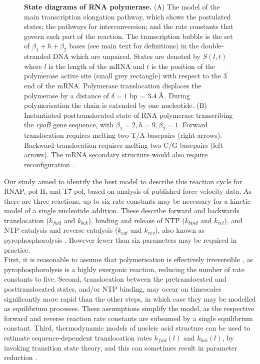 \documentclass[10pt,letterpaper]{article}
\newcommand{\angstrom}{\mbox{\normalfont\AA}}
\begin{document}
\begin{figure}[!h]
\caption{\textbf{ State diagrams of RNA polymerase.}
(A) The model of the main transcription elongation pathway, which shows the postulated states; the pathways for interconversion; and the rate constants that govern each part of the reaction. The transcription bubble is the set of $\beta_1 + h + \beta_2$ bases (see main text for definitions) in the double-stranded DNA which are unpaired. States are denoted by $S(l, t)$ where $l$ is the length of the mRNA and $t$ is the position of the polymerase active site (small grey rectangle) with respect to the $3^\prime$ end of the mRNA.  Polymerase translocation displaces the polymerase by a distance of $\delta = 1$ bp = $3.4\; \angstrom$. During polymerisation the chain is extended by one nucleotide. (B) Instantiated posttranslocated state of RNA polymerase transcribing the \textit{rpoB} gene sequence, with $\beta_1 = 2, h = 9, \beta_2 = 1$. Forward translocation requires melting two T/A basepairs (right arrows). Backward translocation requires melting two C/G basepairs (left arrows). The mRNA secondary structure would also require reconfiguration \cite{tadigotla2006thermodynamic, maoileidigh2011unified}.}
\label{fig2}
\end{figure}




Our study aimed to identify the best model to describe this reaction cycle for RNAP, pol II, and T7 pol, based on analysis of published force-velocity data. As there are three reactions, up to six rate constants may be necessary for a kinetic model of a single nucleotide addition. These describe forward and backwards translocation ($k_{fwd}$ and $k_{bck}$), binding and release of NTP ($k_{bind}$ and $k_{rel}$), and NTP catalysis and reverse-catalysis ($k_{cat}$ and $k_{rev}$), also known as pyrophosphorolysis \cite{maitra1967role}. However fewer than six parameters may be required in practice. \\


First, it is reasonable to assume that polymerisation is effectively irreversible  \cite{erie1992single, rhodes1974ribonucleic, maoileidigh2011unified, bai2004sequence}, as pyrophosphorolysis is a highly exergonic reaction, reducing the number of rate constants to five.
Second, translocation between the pretranslocated and posttranslocated states, and/or NTP binding, may occur on timescales significantly more rapid than the other steps, in which case they may be modelled as equilibrium processes. These assumptions simplify the model, as the respective forward and reverse reaction rate constants are subsumed by a single equilibrium constant. Third, thermodynamic models of nucleic acid structure can be used to estimate sequence-dependent translocation rates $k_{fwd}(l)$ and $k_{bck}(l)$, by invoking transition state theory, and this can sometimes result in parameter reduction \cite{tadigotla2006thermodynamic, maoileidigh2011unified, bai2004sequence}. \\
\end{document}
